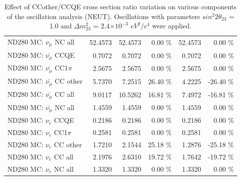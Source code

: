 \begin{table}
\begin{tabular}{| l | r | r  r | r  r |}
                                          ND280 MC: $\nu_{\mu}$ NC all &         52.4573 &         52.4573 &  0.00 \%  &         52.4573 &  0.00 \%  \\ 
                                      ND280 MC: $\bar{\nu_{\mu}}$ CCQE &          0.7072 &          0.7072 &  0.00 \%  &          0.7072 &  0.00 \%  \\ 
                                  ND280 MC: $\bar{\nu_{\mu}}$ CC1$\pi$ &          2.5675 &          2.5675 &  0.00 \%  &          2.5675 &  0.00 \%  \\ 
                                  ND280 MC: $\bar{\nu_{\mu}}$ CC other &          5.7370 &          7.2515 & 26.40 \%  &          4.2225 & -26.40 \%  \\ 
                                    ND280 MC: $\bar{\nu_{\mu}}$ CC all &          9.0117 &         10.5262 & 16.81 \%  &          7.4972 & -16.81 \%  \\ 
                                    ND280 MC: $\bar{\nu_{\mu}}$ NC all &          1.4559 &          1.4559 &  0.00 \%  &          1.4559 &  0.00 \%  \\ 
                                              ND280 MC: $\nu_{e}$ CCQE &          0.2186 &          0.2186 &  0.00 \%  &          0.2186 &  0.00 \%  \\ 
                                          ND280 MC: $\nu_{e}$ CC1$\pi$ &          0.2581 &          0.2581 &  0.00 \%  &          0.2581 &  0.00 \%  \\ 
                                          ND280 MC: $\nu_{e}$ CC other &          1.7210 &          2.1544 & 25.18 \%  &          1.2876 & -25.18 \%  \\ 
                                            ND280 MC: $\nu_{e}$ CC all &          2.1976 &          2.6310 & 19.72 \%  &          1.7642 & -19.72 \%  \\ 
                                            ND280 MC: $\nu_{e}$ NC all &          1.3320 &          1.3320 &  0.00 \%  &          1.3320 &  0.00 \%  \\ 
\hline
\end{tabular}
\caption{ 
  Effect of CCother/CCQE cross section ratio variation
  on various components of the oscillation analysis (NEUT).
  Oscillations with parameters $sin^{2}2\theta_{23}$ = 1.0 and $\Delta m^{2}_{23}$ = 2.4$\times10^{-3}$ $eV^{2}/c^{4}$ were applied.  
}
\label{tab:neut_xsec_ccoth_to_ccqe}
\end{table}


%
%
%
%

